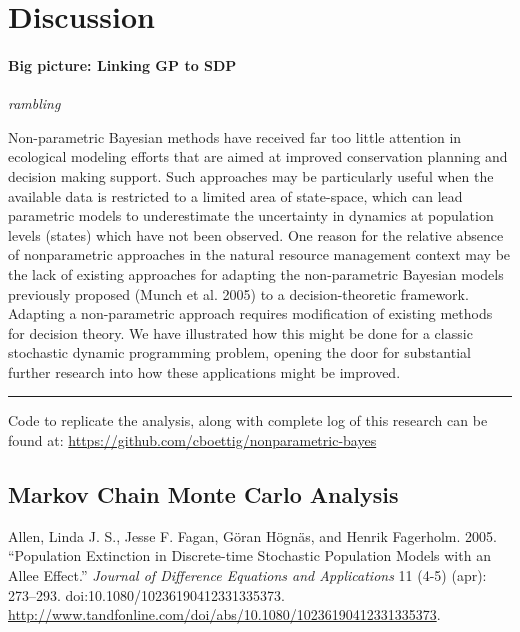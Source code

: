 \documentclass[author-year, review]{elsarticle} %
\begin{document}
\section{Discussion}\label{discussion-1}

\paragraph{Big picture: Linking GP to
SDP}\label{big-picture-linking-gp-to-sdp}

\emph{rambling}

Non-parametric Bayesian methods have received far too little attention
in ecological modeling efforts that are aimed at improved conservation
planning and decision making support. Such approaches may be
particularly useful when the available data is restricted to a limited
area of state-space, which can lead parametric models to underestimate
the uncertainty in dynamics at population levels (states) which have not
been observed. One reason for the relative absence of nonparametric
approaches in the natural resource management context may be the lack of
existing approaches for adapting the non-parametric Bayesian models
previously proposed (Munch et al. 2005) to a decision-theoretic
framework. Adapting a non-parametric approach requires modification of
existing methods for decision theory. We have illustrated how this might
be done for a classic stochastic dynamic programming problem, opening
the door for substantial further research into how these applications
might be improved.

\begin{center}\rule{3in}{0.4pt}\end{center}

Code to replicate the analysis, along with complete log of this research
can be found at:
\href{https://github.com/cboettig/nonparametric-bayes/}{https://github.com/cboettig/nonparametric-bayes}

\subsection{Markov Chain Monte Carlo
Analysis}\label{markov-chain-monte-carlo-analysis}

Allen, Linda J. S., Jesse F. Fagan, Göran Högnäs, and Henrik Fagerholm.
2005. ``Population Extinction in Discrete-time Stochastic Population
Models with an Allee Effect.'' \emph{Journal of Difference Equations and
Applications} 11 (4-5) (apr): 273--293.
doi:10.1080/10236190412331335373.
\url{http://www.tandfonline.com/doi/abs/10.1080/10236190412331335373}.
\end{document}
